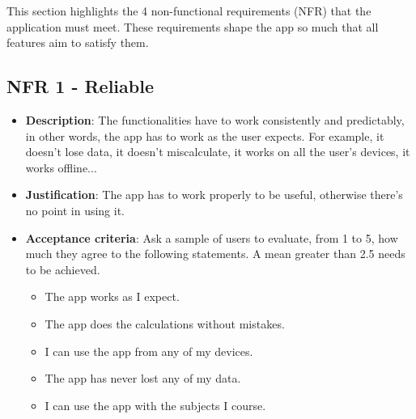 
This section highlights the 4 non-functional requirements (NFR) that the application must meet. These requirements shape the app so much that all features aim to satisfy them.

\subsection*{NFR 1 - Reliable}
\begin{itemize}
    \item \textbf{Description}: The functionalities have to work consistently and predictably, in other words, the app has to work as the user expects. For example, it doesn't lose data, it doesn't miscalculate, it works on all the user's devices, it works offline...
    \item \textbf{Justification}: The app has to work properly to be useful, otherwise there's no point in using it.
    \item \textbf{Acceptance criteria}: Ask a sample of users to evaluate, from 1 to 5, how much they agree to the following statements. A mean greater than 2.5 needs to be achieved.
    \begin{itemize}[noitemsep]
        \item The app works as I expect.
        \item The app does the calculations without mistakes.
        \item I can use the app from any of my devices.
        \item The app has never lost any of my data.
        \item I can use the app with the subjects I course.
    \end{itemize}
\end{itemize}

